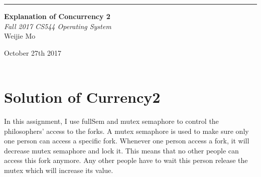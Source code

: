 \documentclass[10pt,draftclsnofoot,peerreview,letterpaper,onecolumn,]{IEEEtran}
\begin{document}
\begin{titlepage} %
	
	\raggedleft %
	
	\rule{1pt}{\textheight} %
	\hspace{0.05\textwidth} %
	\parbox[b]{0.75\textwidth}{ %
		
		{\Huge\bfseries Explanation of Concurrency 2   }\\[2\baselineskip] %
		{\large\textit{Fall 2017 CS544 Operating System}}\\[4\baselineskip] %
		{\Large Weijie Mo} %
		
		\vspace{0.5\textheight} %
		
		{\noindent October 27th 2017}\\[\baselineskip] %
        {\noindent }\\[\baselineskip] %
	}

\end{titlepage}


\section{Solution of Currency2}

In this assignment, I use fullSem and mutex semaphore to control the philosophers' access to the forks. A mutex semaphore is used to make sure only one person can access a specific fork. Whenever one person access a fork, it will decrease mutex semaphore and lock it. This means that no other people can access this fork anymore. Any other people have to wait this person release the mutex which will increase its value.
\end{document}
